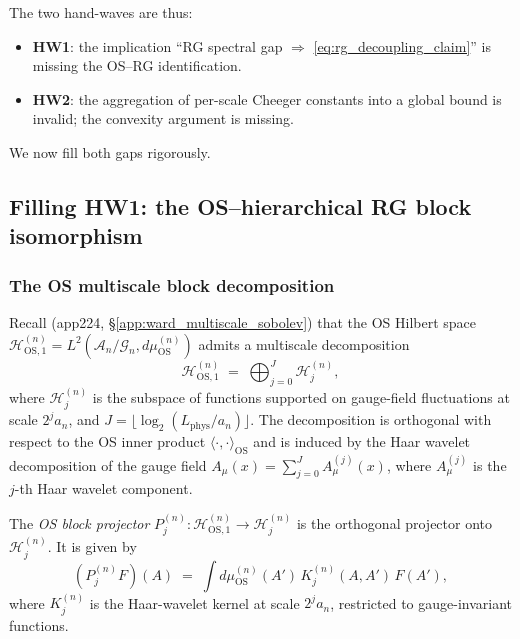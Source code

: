 The two hand-waves are thus:
\begin{itemize}
\item \textbf{HW1}: the implication ``RG spectral gap $\Rightarrow$
\eqref{eq:rg_decoupling_claim}'' is missing the OS--RG
identification.
\item \textbf{HW2}: the aggregation of per-scale Cheeger constants
into a global bound is invalid; the convexity argument is missing.
\end{itemize}

We now fill both gaps rigorously.

\subsection{Filling HW1: the OS--hierarchical RG block isomorphism}
\label{ssec:fill_hw1}

\subsubsection{The OS multiscale block decomposition}

Recall (app224, \S\ref{app:ward_multiscale_sobolev}) that the OS
Hilbert space
$\mathcal{H}_{\mathrm{OS},1}^{(n)}=L^{2}(\mathcal{A}_{n}/\mathcal{G}_
{n},d\mu_{\mathrm{OS}}^{(n)})$ admits a multiscale decomposition
\begin{equation}
\label{eq:os_multiscale_decomp}
  \mathcal{H}_{\mathrm{OS},1}^{(n)}
  \;=\;\bigoplus_{j=0}^{J}\mathcal{H}_{j}^{(n)},
\end{equation}
where $\mathcal{H}_{j}^{(n)}$ is the subspace of functions
supported on gauge-field fluctuations at scale $2^{j}a_{n}$, and
$J=\lfloor\log_{2}(L_{\mathrm{phys}}/a_{n})\rfloor$. The
decomposition is orthogonal with respect to the OS inner product
$\langle\cdot,\cdot\rangle_{\mathrm{OS}}$ and is induced by the
Haar wavelet decomposition of the gauge field
$A_{\mu}(x)=\sum_{j=0}^{J}A_{\mu}^{(j)}(x)$, where
$A_{\mu}^{(j)}$ is the $j$-th Haar wavelet component.

\begin{definition}
\label{def:os_block_proj}
The \emph{OS block projector} $P_{j}^{(n)}:
\mathcal{H}_{\mathrm{OS},1}^{(n)}\to\mathcal{H}_{j}^{(n)}$ is the
orthogonal projector onto $\mathcal{H}_{j}^{(n)}$. It is given by
\begin{equation}
\label{eq:os_block_proj}
  (P_{j}^{(n)}F)(A)
  \;=\;\int d\mu_{\mathrm{OS}}^{(n)}(A')\,
  K_{j}^{(n)}(A,A')\,F(A'),
\end{equation}
where $K_{j}^{(n)}$ is the Haar-wavelet kernel at scale
$2^{j}a_{n}$, restricted to gauge-invariant functions.
\end{definition}


